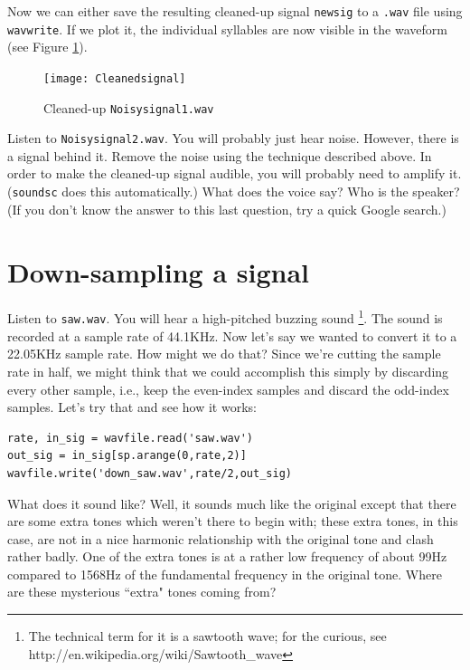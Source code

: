 Now we can either save the resulting cleaned-up signal \texttt{newsig} to a \texttt{.wav} file using \texttt{wavwrite}. If we plot it, the individual syllables are now visible in the waveform (see Figure \ref{cleansignal}).

\begin{figure}[ht]\caption{Cleaned-up \texttt{Noisysignal1.wav} }\label{cleansignal}\centering\texttt{[image: Cleanedsignal]}\end{figure}

\begin{problem}
Listen to \texttt{Noisysignal2.wav}. You will probably just hear noise. However, there is a signal behind it. Remove the noise using the technique described above. In order to make the cleaned-up signal audible, you will probably need to amplify it. (\texttt{soundsc} does this automatically.) What does the voice say? Who is the speaker? (If you don't know the answer to this last question, try a quick Google search.)
\end{problem}

\section*{Down-sampling a signal}

Listen to \texttt{saw.wav}. You will hear a high-pitched buzzing sound \footnote{The technical term for it is a sawtooth wave; for the curious, see http://en.wikipedia.org/wiki/Sawtooth\_wave}. The sound is recorded at a sample rate of 44.1KHz. Now let's say we wanted to convert it to a 22.05KHz sample rate. How might we do that? Since we're cutting the sample rate in half, we might think that we could accomplish this simply by discarding every other sample, i.e., keep the even-index samples and discard the odd-index samples. Let's try that and see how it works:
\begin{lstlisting}
rate, in_sig = wavfile.read('saw.wav')
out_sig = in_sig[sp.arange(0,rate,2)]
wavfile.write('down_saw.wav',rate/2,out_sig)
\end{lstlisting}
What does it sound like? Well, it sounds much like the original except that there are some extra tones which weren't there to begin with; these extra tones, in this case, are not in a nice harmonic relationship with the original tone and clash rather badly. One of the extra tones is at a rather low frequency of about 99Hz compared to 1568Hz of the fundamental frequency in the original tone. Where are these mysterious ``extra" tones coming from?

